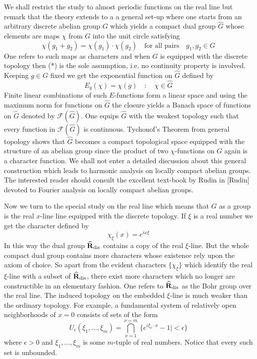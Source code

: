 \documentclass{amsart}
\def\uuu{_}
\def\vvv{-}
\begin{document}
{\noindent
We shall
restrict the study to almost periodic
 functions on the real line but
remark that the theory
extends to a a general set\vvv up where
one starts from an arbitrary discrete abelian group $G$
which yields a compact dual group
$\widehat G$ whose elements are maps $\chi$ from $G$ into
the unit  circle satisfying
\[ 
\chi(g\uuu 1+g\uuu 2)= \chi(g\uuu 1)\cdot \chi(g\uuu 2)\quad
\text{for all pairs}\quad  g\uuu 1,g\uuu 2\in G\tag{*}
\]
One refers to such maps as characters 
and when $G$ is equipped with the discrete topology then 
(*) is the sole assumption, i.e. no continuity property is involved.
Keeping $g\in G$ fixed we get  the   exponential
function on
$\widehat G$ defined by
\[
E\uuu g(\chi)= \chi(g)\quad \colon\quad \chi\in \widehat G
\]
Finite linear combinations of such $E$\vvv functions form a linear space and
using the maximum norm for functions on $\widehat G$
the  closure  yields a Banach space
of functions on $\widehat G$  denoted by
$\mathcal F(\widehat G)$.
One equips $\widehat G$ with the weakest topology such that
every function
in $\mathcal F(\widehat G)$ is continuous. 
Tychonof's Theorem from general topology shows that 
$\widehat G$ becomes a compact topological space 
equipped with the structure of an abelian group since
the product of two $\chi$\vvv functions on $G$ again is a character function.
We shall not enter a detailed discussion about this general construction which leads to
harmonic analysis on  locally compact abelian groups.
The interested reader should consult the
excellent text\vvv book by Rudin in [Rudin] 
devoted to   Fourier analysis on locally compact
abelian groups.
\medskip

\noindent
Now we turn to the special study on the real line
which means that $G$ as a group is the real $x$\vvv line line equipped with
the discrete topology. If $\xi$ is a real number we get the character defined by
\[ 
\chi\uuu \xi(x)= e^{ix\xi}
\]
In this way the dual group $\widehat {\bf{R}}\uuu{\text{dis}}$
contains a copy of the real $\xi$\vvv line.
But the whole compact dual group contains more characters
whose existence rely upon the axiom of choice.
So apart from the evident characters
$\{\chi\uuu \xi\}$ which identify the real $\xi$\vvv line with a subset
of $\widehat {\bf{R}}\uuu{\text{dis}}$, there exist 
more characters which no longer are
constructible in an elementary fashion.
One refers to $\widehat {\bf{R}}\uuu{\text{dis}}$
as the Bohr group over the real line. The induced topology on the embedded
$\xi$\vvv line is much weaker  than the
ordinary topology. For example, a fundamental system
of relatively open neighborhoods of $x=0$ consists of sets of the form
\[
U\uuu\epsilon(\xi\uuu1,\ldots,\xi\uuu m)=
\bigcap\uuu{\nu=1}^{\nu=m} \,\{e^{i\xi\uuu \nu\cdot x}\vvv 1|<\epsilon\}
\]
where $\epsilon>0$ and $\xi\uuu 1,\ldots,\xi\uuu m$ is some 
$m$\vvv tuple of real numbers.
Notice that every such set is unbounded.

}
\end{document}
